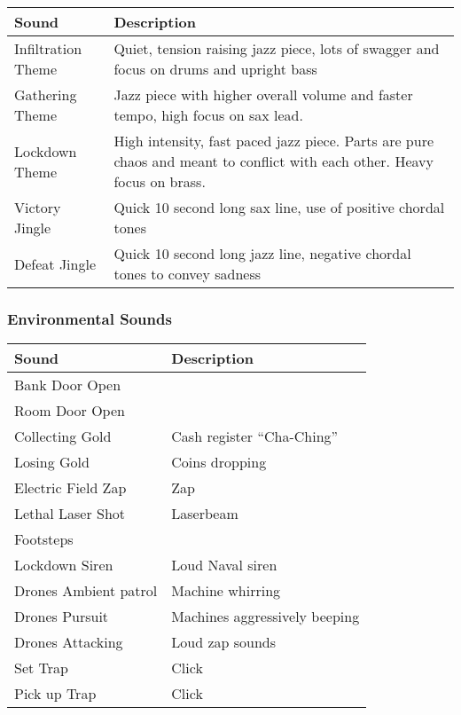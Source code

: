 \documentclass[10pt]{report}
\begin{document}
\begin{center}
    \begin{tabular}{| p{.45\linewidth} | p{.45\linewidth} |}
        \hline
        Sound & Description \\  \hline
        Infiltration Theme  &     Quiet, tension raising jazz piece, lots of swagger and focus on drums and upright bass \\ \hline
        Gathering Theme    &     Jazz piece with higher overall volume and faster tempo, high focus on sax lead. \\ \hline
        Lockdown Theme  &     High intensity, fast paced jazz piece. Parts are pure chaos and meant to conflict with each other. Heavy focus on brass. \\ \hline
        Victory Jingle  &     Quick 10 second long sax line, use of positive chordal tones \\ \hline
        Defeat Jingle   &     Quick 10 second long jazz line, negative chordal tones to convey sadness \\
        \hline
    \end{tabular}
\end{center}

\subsubsection{Environmental Sounds}

\begin{center}
    \begin{tabular}{| p{.45\linewidth} | p{.45\linewidth} |}
        \hline
        Sound & Description \\  \hline
        Bank Door Open  &  \\   \hline
        Room Door Open  &  \\   \hline
        Collecting Gold & Cash register “Cha-Ching” \\  \hline
        Losing Gold & Coins dropping \\ \hline
        Electric Field Zap  & Zap \\    \hline
        Lethal Laser Shot   & Laserbeam \\  \hline
        Footsteps   &  \\   \hline
        Lockdown Siren  & Loud Naval siren \\   \hline
        Drones Ambient patrol   & Machine whirring \\   \hline
        Drones Pursuit  & Machines aggressively beeping \\  \hline
        Drones Attacking    & Loud zap sounds \\    \hline
        Set Trap    & Click \\  \hline
        Pick up Trap    & Click \\
        \hline
    \end{tabular}
\end{center}
\end{document}
